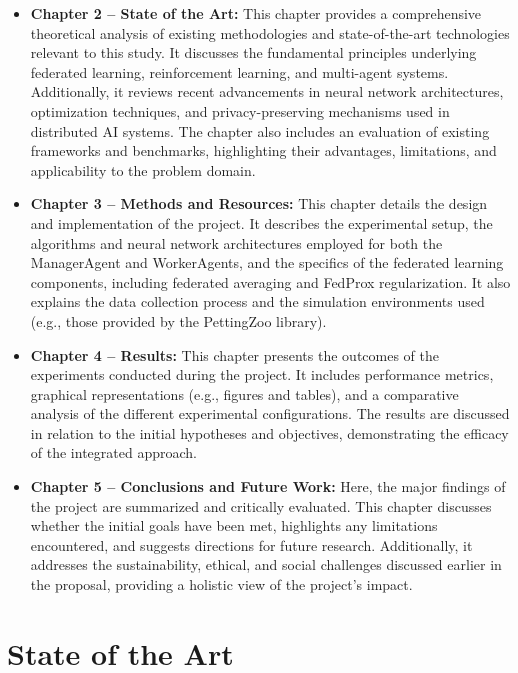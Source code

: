 \documentclass[12pt,a4paper,twoside,openany]{book}
\begin{document}
\begin{itemize}

	\item \textbf{Chapter 2 -- State of the Art:}  
	This chapter provides a comprehensive theoretical analysis of existing methodologies and state-of-the-art technologies relevant to this study. It discusses the fundamental principles underlying federated learning, reinforcement learning, and multi-agent systems. Additionally, it reviews recent advancements in neural network architectures, optimization techniques, and privacy-preserving mechanisms used in distributed AI systems. The chapter also includes an evaluation of existing frameworks and benchmarks, highlighting their advantages, limitations, and applicability to the problem domain.


    \item \textbf{Chapter 3 -- Methods and Resources:}  
    This chapter details the design and implementation of the project. It describes the experimental setup, the algorithms and neural network architectures employed for both the ManagerAgent and WorkerAgents, and the specifics of the federated learning components, including federated averaging and FedProx regularization. It also explains the data collection process and the simulation environments used (e.g., those provided by the PettingZoo library). 

    \item \textbf{Chapter 4 -- Results:}  
    This chapter presents the outcomes of the experiments conducted during the project. It includes performance metrics, graphical representations (e.g., figures and tables), and a comparative analysis of the different experimental configurations. The results are discussed in relation to the initial hypotheses and objectives, demonstrating the efficacy of the integrated approach. 

    \item \textbf{Chapter 5 -- Conclusions and Future Work:}  
    Here, the major findings of the project are summarized and critically evaluated. This chapter discusses whether the initial goals have been met, highlights any limitations encountered, and suggests directions for future research. Additionally, it addresses the sustainability, ethical, and social challenges discussed earlier in the proposal, providing a holistic view of the project's impact.

\end{itemize}

\chapter{State of the Art}
\end{document}
